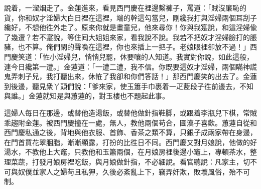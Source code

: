 說着，一溜烟走了。金蓮進來，看見西門慶在裡邊繫褲子，罵道：「賊沒廉恥的貨，你和奴才淫婦大白日裡在這裡，端的幹這勾當兒，剛纔我打與淫婦兩個耳刮子纔好，不想他徃外走了。原來你就是畫童兒，他來尋你！你與我寔說，和這淫婦偸了幾遭？若不寔說，等住囘大姐姐來家，看我說不說。我若不把奴才淫婦臉打的脹豬，也不算。俺們閑的聲喚在這裡，你也來插上一把子。{}老娘眼裡卻放不過！」西門慶笑道：「恠小淫婦兒，悄悄兒罷，休要嚷的人知道。我實對你說，如此這般，連今日纔第一遭。」金蓮道：「一遭二遭，我不信。你既要這奴才淫婦，兩個瞞神謊鬼弄刺子兒，我打聽出來，休恠了我卻和你們答話！」那西門慶笑的出去了。金蓮到後邊，聽見衆丫頭們說：「爹來家，使玉簫手巾裹着一疋藍段子徃前邊去，不知與誰。」金蓮就知是與蕙蓮的，對玉樓也不題起此事。

這婦人每日在那邊，或替他造湯飯，或替他做針指鞋脚，或跟着李瓶兒下棋，常賊乖趨附金蓮。被西門慶撞在一處，無人，教他兩個苟合，圖漢子喜歡。蕙蓮自從和西門慶私通之後，背地與他衣服、首飾、香茶之類不算，只銀子成兩家帶在身邊，在門首買花翠胭脂，漸漸顯露，打扮的比徃日不同。西門慶又對月娘說，他做的好湯水，不教他上大竈，只教他和玉簫兩個，在月娘房裡後邊小竈上，專頓茶水，整理菜蔬，打發月娘房裡吃飯，與月娘做針指，不必細說。看官聽說：凡家主，切不可與奴僕並家人之婦苟且私狎，久後必紊亂上下，竊弄奸欺，敗壞風俗，殆不可制。

